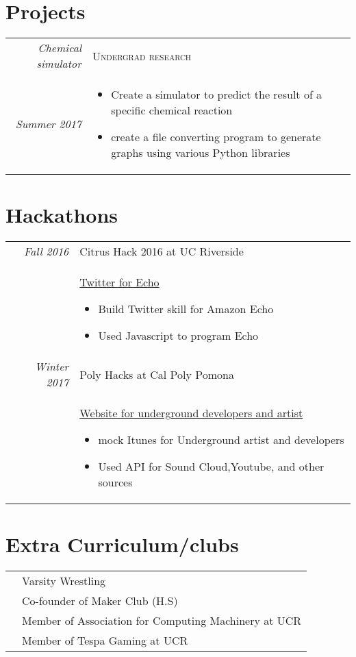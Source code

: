\documentclass[a4paper,12pt]{article}
\begin{document}
\section{Projects}

\begin{tabular}{r|p{11cm}}
 \emph{Chemical simulator} & \textsc{Undergrad research} \\\emph{Summer 2017}&\footnotesize\begin{itemize}
  \item Create a simulator to predict the result of a specific chemical reaction  
  \item create a file converting program to generate graphs using various Python libraries
  
\end{itemize}


\end{tabular}


\section{Hackathons}
\begin{tabular}{r|p{11cm}}
 \emph{Fall 2016} & Citrus Hack 2016 at UC Riverside\\
    &\href{https://github.com/jluo117/echo_twitter_program}{Twitter for Echo}
 \footnotesize\begin{itemize}
  \item Build Twitter skill for Amazon Echo
  \item Used Javascript to program Echo
\end{itemize}\\
\emph{Winter 2017} & Poly Hacks at Cal Poly Pomona\\
    & \href{https://github.com/jluo117/PolyHacks}{Website for underground developers and artist}
 \footnotesize\begin{itemize}
  \item mock Itunes for Underground artist and developers
  \item Used API for Sound Cloud,Youtube, and other sources
\end{itemize}
\end{tabular}
\section{Extra Curriculum/clubs}
\begin{tabular}{rl}
&Varsity Wrestling \\
&Co-founder of Maker Club (H.S)\\
&Member of Association for Computing Machinery at UCR \\
&Member of Tespa Gaming at UCR\\


\end{tabular}
\end{document}
